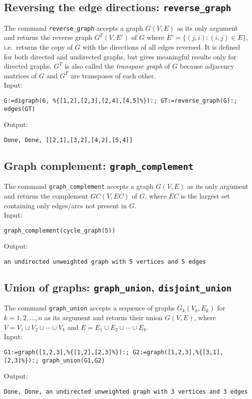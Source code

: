 \documentclass[a4paper,11pt]{article}
\begin{document}
\subsection{Reversing the edge directions: {\tt reverse\_graph}}

The command {\tt reverse\_graph} accepts a graph $ G(V,E) $ as its only argument and returns the reverse graph $ G^T(V,E') $ of $ G $ where $ E'=\{(j,i):(i,j)\in E\} $, i.e.~returns the copy of $ G $ with the directions of all edges reversed. It is defined for both directed and undirected graphs, but gives meaningful results only for directed graphs. $ G^T $ is also called the \emph{transpose graph} of $ G $ because adjacency matrices of $ G $ and $ G^T $ are transposes of each other.\\
Input:
\begin{center}
  \tt G:=digraph(6, \%\{[1,2],[2,3],[2,4],[4,5]\%\}):; GT:=reverse\_graph(G):; edges(GT)
\end{center}
Output:
\begin{center}
  \tt Done, Done, [[2,1],[3,2],[4,2],[5,4]]
\end{center}

\subsection{Graph complement: {\tt graph\_complement}}

The command {\tt graph\_complement} accepts a graph $ G(V,E) $ as its only argument and returns the complement $ GC(V,EC) $ of $ G $, where $ EC $ is the largest set containing only edges/arcs not present in $ G $.\\
Input:
\begin{center}
  \tt graph\_complement(cycle\_graph(5))
\end{center}
Output:
\begin{center}
  \tt an undirected unweighted graph with 5 vertices and 5 edges
\end{center}

\subsection{Union of graphs: {\tt graph\_union}, {\tt disjoint\_union}}

The command {\tt graph\_union} accepts a sequence of graphs $ G_k(V_k,E_k) $ for $ k=1,2,\dots,n $ as its argument and returns their union $ G(V,E) $, where $ V=V_1\cup V_2\cup\cdots\cup V_k $ and $ E=E_1\cup E_2\cup\cdots\cup E_k $.\\
Input:
\begin{center}
  \tt G1:=graph([1,2,3],\%\{[1,2],[2,3]\%\}):; G2:=graph([1,2,3],\%\{[3,1],[2,3]\%\}):; graph\_union(G1,G2)
\end{center}
Output:
\begin{center}
  \tt Done, Done, an undirected unweighted graph with 3 vertices and 3 edges
\end{center}
\end{document}
